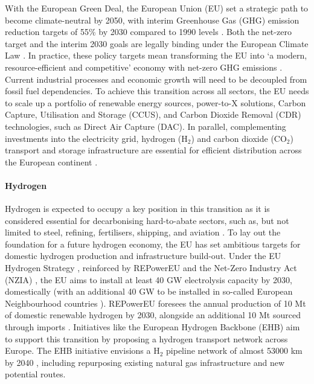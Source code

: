 \documentclass[pdflatex,sn-nature]{sn-jnl}%
\theoremstyle{thmstyleone}%
\theoremstyle{thmstyletwo}%
\theoremstyle{thmstylethree}%
\begin{document}

\maketitle

With the European Green Deal, the European Union (EU) set a strategic path to become climate-neutral by 2050, with interim Greenhouse Gas (GHG) emission reduction targets of 55\% by 2030 compared to 1990 levels \cite{europeancommissionFit55Delivering2021}. Both the net-zero target and the interim 2030 goals are legally binding under the European Climate Law \cite{europeanparliamentRegulationEU20212021}. In practice, these policy targets mean transforming the EU into `a modern, resource-efficient and competitive' economy with net-zero GHG emissions \cite{europeancommissionEuropeanGreenDeal2021}. Current industrial processes and economic growth will need to be decoupled from fossil fuel dependencies. To achieve this transition across all sectors, the EU needs to scale up a portfolio of renewable energy sources, power-to-X solutions, Carbon Capture, Utilisation and Storage (CCUS), and Carbon Dioxide Removal (CDR) technologies, such as Direct Air Capture (DAC). In parallel, complementing investments into the electricity grid, hydrogen (H$_2$) and carbon dioxide (CO$_2$) transport and storage infrastructure are essential for efficient distribution across the European continent \cite{hofmannH2CO2Network2025}.

\paragraph{Hydrogen}
Hydrogen is expected to occupy a key position in this transition as it is considered essential for decarbonising hard-to-abate sectors, such as, but not limited to steel, refining, fertilisers, shipping, and aviation \cite{beresWillHydrogenSynthetic2024,neumannPotentialRoleHydrogen2023}. To lay out the foundation for a future hydrogen economy, the EU has set ambitious targets for domestic hydrogen production and infrastructure build-out. Under the EU Hydrogen Strategy \cite{europeancommissionCommunicationCommissionEuropean2020}, reinforced by REPowerEU \cite{europeancommissionREPowerEUPlanCommunication2022} and the Net-Zero Industry Act (NZIA) \cite{europeanparliamentRegulationEU20242024}, the EU aims to install at least 40 GW electrolysis capacity by 2030, domestically (with an additional 40 GW to be installed in so-called European Neighbourhood countries \cite{europeanparliamentRegulationEU20212021a}). REPowerEU foresees the annual production of 10 Mt of domestic renewable hydrogen by 2030, alongside an additional 10 Mt sourced through imports \cite{europeancommissionREPowerEUPlanCommunication2022}. Initiatives like the European Hydrogen Backbone (EHB) aim to support this transition by proposing a hydrogen transport network across Europe. The EHB initiative envisions a H$_2$ pipeline network of almost 53000 km by 2040 \cite{europeanhydrogenbackboneinitiativeEuropeanHydrogenBackbone2022}, including repurposing existing natural gas infrastructure and new potential routes.
\end{document}
